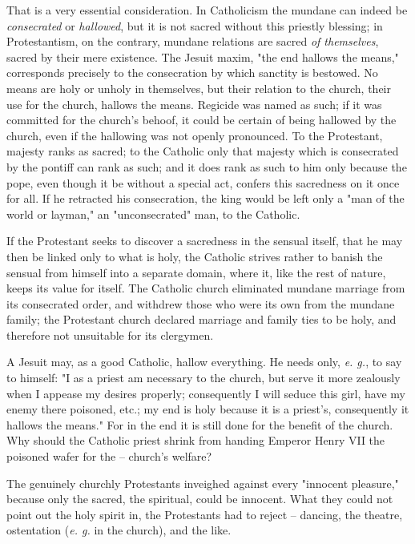 \documentclass[a4paper]{book}
\begin{document}
That is a very essential consideration. In Catholicism the mundane can indeed 
be \textit{consecrated} or \textit{hallowed}, but it is not sacred without 
this priestly blessing; in Protestantism, on the contrary, mundane relations 
are sacred \textit{of themselves}, sacred by their mere existence. The Jesuit 
maxim, "{}the end hallows the means,"{} corresponds precisely to the 
consecration by which sanctity is bestowed. No means are holy or unholy in 
themselves, but their relation to the church, their use for the church, 
hallows the means. Regicide was named as such; if it was committed for the 
church's behoof, it could be certain of being hallowed by the church, even if 
the hallowing was not openly pronounced. To the Protestant, majesty ranks as 
sacred; to the Catholic only that majesty which is consecrated by the pontiff 
can rank as such; and it does rank as such to him only because the pope, even 
though it be without a special act, confers this sacredness on it once for 
all. If he retracted his consecration, the king would be left only a "{}man of 
the world or layman,"{} an "{}unconsecrated"{} man, to the Catholic.

If the Protestant seeks to discover a sacredness in the sensual itself, that 
he may then be linked only to what is holy, the Catholic strives rather to 
banish the sensual from himself into a separate domain, where it, like the 
rest of nature, keeps its value for itself. The Catholic church eliminated 
mundane marriage from its consecrated order, and withdrew those who were its 
own from the mundane family; the Protestant church declared marriage and 
family ties to be holy, and therefore not unsuitable for its clergymen.

A Jesuit may, as a good Catholic, hallow everything. He needs only, \textit{e. 
g.}, to say to himself: "{}I as a priest am necessary to the church, but serve 
it more zealously when I appease my desires properly; consequently I will 
seduce this girl, have my enemy there poisoned, etc.; my end is holy because 
it is a priest's, consequently it hallows the means."{} For in the end it is 
still done for the benefit of the church. Why should the Catholic priest 
shrink from handing Emperor Henry VII the poisoned wafer for the -- church's 
welfare?

The genuinely churchly Protestants inveighed against every "{}innocent 
pleasure,"{} because only the sacred, the spiritual, could be innocent. What 
they could not point out the holy spirit in, the Protestants had to reject -- 
dancing, the theatre, ostentation (\textit{e. g.} in the church), and the 
like.
\end{document}
